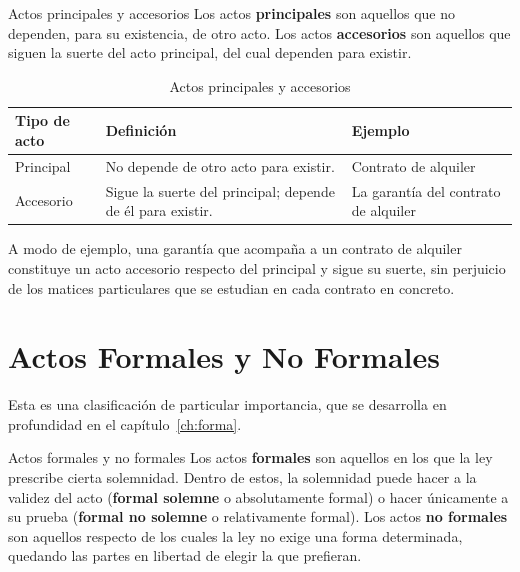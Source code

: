 \documentclass[12pt,oneside]{book}
\begin{document}
\begin{definition}{Actos principales y accesorios}
Los actos \textbf{principales} son aquellos que no dependen, para su existencia, de otro acto. Los actos \textbf{accesorios} son aquellos que siguen la suerte del acto principal, del cual dependen para existir.
\end{definition}

\begin{table}[H]
\centering
\begin{tabularx}{\textwidth}{l X X}
\toprule
\textbf{Tipo de acto} & \textbf{Definición} & \textbf{Ejemplo} \\
\midrule
Principal & No depende de otro acto para existir. & Contrato de alquiler \\
Accesorio & Sigue la suerte del principal; depende de él para existir. & La garantía del contrato de alquiler \\
\bottomrule
\end{tabularx}
\caption{Actos principales y accesorios}
\end{table}

A modo de ejemplo, una garantía que acompaña a un contrato de alquiler constituye un acto accesorio respecto del principal y sigue su suerte, sin perjuicio de los matices particulares que se estudian en cada contrato en concreto.

\section{Actos Formales y No Formales}

Esta es una clasificación de particular importancia, que se desarrolla en profundidad en el capítulo~\ref{ch:forma}.

\begin{definition}{Actos formales y no formales}
Los actos \textbf{formales} son aquellos en los que la ley prescribe cierta solemnidad. Dentro de estos, la solemnidad puede hacer a la validez del acto (\textbf{formal solemne} o absolutamente formal) o hacer únicamente a su prueba (\textbf{formal no solemne} o relativamente formal). Los actos \textbf{no formales} son aquellos respecto de los cuales la ley no exige una forma determinada, quedando las partes en libertad de elegir la que prefieran.
\end{definition}
\end{document}
